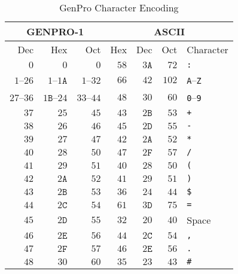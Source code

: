\documentclass{report}
\begin{document}
\begin{table}
\centering
\caption{GenPro Character Encoding}
\label{Tbl.}
\begin{tabular}{|rrr|rrrl|}
\multicolumn{3}{c}{GENPRO-1} & \multicolumn{4}{c}{ASCII} \\
\hline
Dec & Hex & Oct & Hex & Dec & Oct & Character \\
\hline
\(  0\) & \(  0\) & \(  0\) & \( 58\) & \( 3\mathtt{A}\) & \( 72\) & \texttt{:} \\
\hline
\(1\)--\(26\) & %
\(1\)--\(1\mathtt{A}\) & %
\(1\)--\(32\) & %
\( 66\) & %
\( 42\) & %
\(102\) & %
\texttt{A}--\texttt{Z} \\ %
\hline
\(27\)--\(36\) & %
\(1\mathtt{B}\)--\(24\) & %
\(33\)--\(44\) & %
\( 48\) & %
\( 30\) & %
\( 60\) & %
\texttt{0}--\texttt{9} \\ %
\hline
\( 37\) & \( 25\) & \( 45\) & \( 43\) & \( 2\mathtt{B}\) & \( 53\) & \texttt{+} \\ \hline
\( 38\) & \( 26\) & \( 46\) & \( 45\) & \( 2\mathtt{D}\) & \( 55\) & \texttt{-} \\ \hline
\( 39\) & \( 27\) & \( 47\) & \( 42\) & \( 2\mathtt{A}\) & \( 52\) & \texttt{*} \\ \hline
\( 40\) & \( 28\) & \( 50\) & \( 47\) & \( 2\mathtt{F}\) & \( 57\) & \texttt{/} \\ \hline
\( 41\) & \( 29\) & \( 51\) & \( 40\) & \( 28\) & \( 50\) & \texttt{(} \\ \hline
\( 42\) & \( 2\mathtt{A}\) & \( 52\) & \( 41\) & \( 29\) & \( 51\) & \texttt{)} \\ \hline
\( 43\) & \( 2\mathtt{B}\) & \( 53\) & \( 36\) & \( 24\) & \( 44\) & \texttt{\$} \\ \hline
\( 44\) & \( 2\mathtt{C}\) & \( 54\) & \( 61\) & \( 3\mathtt{D}\) & \( 75\) & \texttt{=} \\ \hline
\( 45\) & \( 2\mathtt{D}\) & \( 55\) & \( 32\) & \( 20\) & \( 40\) & Space \\ \hline
\( 46\) & \( 2\mathtt{E}\) & \( 56\) & \( 44\) & \( 2\mathtt{C}\) & \( 54\) & \texttt{,} \\ \hline
\( 47\) & \( 2\mathtt{F}\) & \( 57\) & \( 46\) & \( 2\mathtt{E}\) & \( 56\) & \texttt{.} \\ \hline
\( 48\) & \( 30\) & \( 60\) & \( 35\) & \( 23\) & \( 43\) & \texttt{\#} \\ \hline

\end{tabular}
\end{table}
\end{document}
